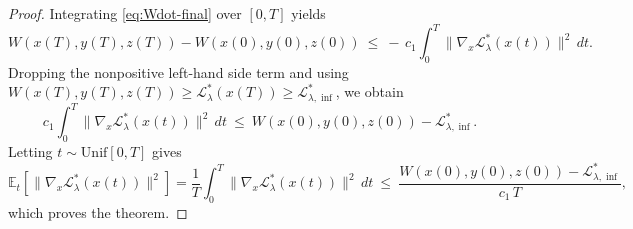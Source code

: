 \documentclass{article}
\newcommand{\1}{\mathbf{1}}
\begin{document}
\begin{proof}
Integrating \eqref{eq:Wdot-final} over $[0,T]$ yields
\[
W(x(T),y(T),z(T)) - W(x(0),y(0),z(0))
\ \le\
-\,c_1\int_{0}^{T}\|\nabla_x\mathcal L_\lambda^{*}(x(t))\|^{2}\,dt.
\]
Dropping the nonpositive left-hand side term and using
$W(x(T),y(T),z(T))\ge \mathcal L_\lambda^{*}(x(T))\ge \mathcal L_{\lambda,\inf}^{*}$, we obtain
\[
c_1\int_{0}^{T}\|\nabla_x\mathcal L_\lambda^{*}(x(t))\|^{2}\,dt
\ \le\
W(x(0),y(0),z(0))-\mathcal L_{\lambda,\inf}^{*}.
\]
Letting $t\sim\mathrm{Unif}[0,T]$ gives
\[
\mathbb E_t\!\left[\|\nabla_x\mathcal L_\lambda^{*}(x(t))\|^{2}\right]
=
\frac{1}{T}\int_{0}^{T}\|\nabla_x\mathcal L_\lambda^{*}(x(t))\|^{2}\,dt
\ \le\
\frac{W(x(0),y(0),z(0))-\mathcal L_{\lambda,\inf}^{*}}{c_1\,T},
\]
which proves the theorem.
\end{proof} 


\medskip 
\end{document}
